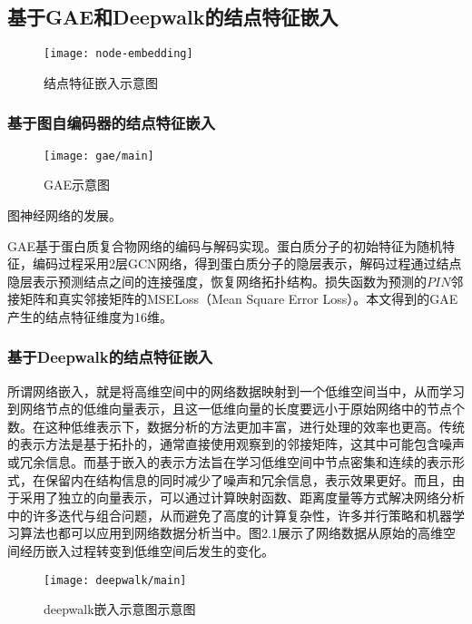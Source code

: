 \subsection{基于GAE和Deepwalk的结点特征嵌入}
\label{subsection:featPPINetwork:nodeFeatConstruct}

\begin{figure}[htbp]
    \centering
    \texttt{[image: node-embedding]}
    \caption{结点特征嵌入示意图}
    \label{fig:node-embedding}
\end{figure}


\subsubsection{基于图自编码器的结点特征嵌入}

\begin{figure}[htbp]
    \centering
    \texttt{[image: gae/main]}
    \caption{GAE示意图}
    \label{fig:gae/main}
\end{figure}

图神经网络的发展\cite{wu_comprehensive_2020}。

GAE\cite{kipf_variational_2016}基于蛋白质复合物网络的编码与解码实现。蛋白质分子的初始特征为随机特征，编码过程采用2层GCN网络，得到蛋白质分子的隐层表示，解码过程通过结点隐层表示预测结点之间的连接强度，恢复网络拓扑结构。损失函数为预测的$PIN$邻接矩阵和真实邻接矩阵的MSELoss（Mean Square Error Loss）。本文得到的GAE产生的结点特征维度为16维。
\subsubsection{基于Deepwalk的结点特征嵌入}

所谓网络嵌入，就是将高维空间中的网络数据映射到一个低维空间当中，从而学习到网络节点的低维向量表示，且这一低维向量的长度要远小于原始网络中的节点个数。在这种低维表示下，数据分析的方法更加丰富，进行处理的效率也更高。传统的表示方法是基于拓扑的，通常直接使用观察到的邻接矩阵，这其中可能包含噪声或冗余信息。而基于嵌入的表示方法旨在学习低维空间中节点密集和连续的表示形式，在保留内在结构信息的同时减少了噪声和冗余信息，表示效果更好。而且，由于采用了独立的向量表示，可以通过计算映射函数、距离度量等方式解决网络分析中的许多迭代与组合问题，从而避免了高度的计算复杂性，许多并行策略和机器学习算法也都可以应用到网络数据分析当中。图2.1展示了网络数据从原始的高维空间经历嵌入过程转变到低维空间后发生的变化。

\begin{figure}[htbp]
    \centering
    \texttt{[image: deepwalk/main]}
    \caption{deepwalk嵌入示意图示意图}
    \label{fig:deepwalk/main}
\end{figure}


